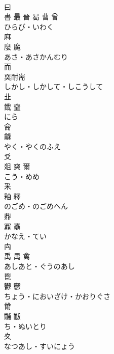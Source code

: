 \documentclass[8pt]{extreport}
\begin{document}
\begin{CJK}{UTF8}{min}
\\	曰	
\\	書 最 晉 曷 曹 曾	
\\	ひらび・いわく	
\\	麻	
\\	麼 魔	
\\	あさ・あさかんむり	
\\	而	
\\	耎耐耑	
\\	しかし・しかして・しこうして	
\\	韭	
\\	韱 韲	
\\	にら	
\\	龠	
\\	龣	
\\	やく・やくのふえ	
\\	爻	
\\	爼 爽 爾	
\\	こう・めめ	
\\	釆	
\\	釉 釋	
\\	のごめ・のごめへん	
\\	鼎	
\\	鼏 鼒	
\\	かなえ・てい	
\\	禸	
\\	禹 禺 禽	
\\	あしあと・ぐうのあし	
\\	鬯	
\\	鬰 鬱	
\\	ちょう・においざけ・かおりぐさ	
\\	黹	
\\	黼 黻	
\\	ち・ぬいとり	
\\	夊	
\\	なつあし・すいにょう	
\end{CJK}
\end{document}
